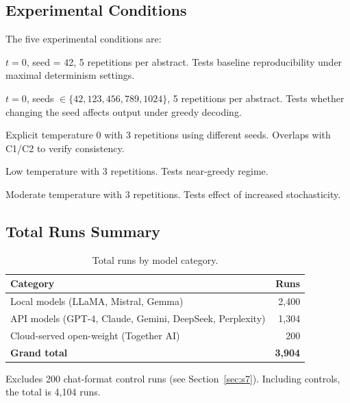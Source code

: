 \documentclass[11pt]{article}
\begin{document}
\subsection{Experimental Conditions}

The five experimental conditions are:

\begin{description}[noitemsep]
    \item[C1 (Fixed seed):] $t = 0$, seed = 42, 5 repetitions per abstract. Tests baseline reproducibility under maximal determinism settings.
    \item[C2 (Variable seed):] $t = 0$, seeds $\in \{42, 123, 456, 789, 1024\}$, 5 repetitions per abstract. Tests whether changing the seed affects output under greedy decoding.
    \item[C3 ($t = 0.0$):] Explicit temperature 0 with 3 repetitions using different seeds. Overlaps with C1/C2 to verify consistency.
    \item[C3 ($t = 0.3$):] Low temperature with 3 repetitions. Tests near-greedy regime.
    \item[C3 ($t = 0.7$):] Moderate temperature with 3 repetitions. Tests effect of increased stochasticity.
\end{description}

\subsection{Total Runs Summary}

\begin{table}[H]
\centering
\caption{Total runs by model category.}
\small
\begin{tabular}{@{}lr@{}}
\toprule
\textbf{Category} & \textbf{Runs} \\
\midrule
Local models (LLaMA, Mistral, Gemma) & 2,400 \\
API models (GPT-4, Claude, Gemini, DeepSeek, Perplexity) & 1,304 \\
Cloud-served open-weight (Together AI) & 200 \\
\midrule
\textbf{Grand total} & \textbf{3,904} \\
\bottomrule
\end{tabular}
\par\smallskip\raggedright\footnotesize
Excludes 200 chat-format control runs (see Section~\ref{sec:s7}). Including controls, the total is 4,104 runs.
\end{table}


\end{document}
